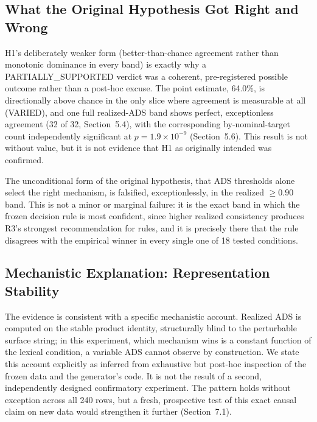 \documentclass[11pt]{article}
\begin{document}
\subsection{What the Original Hypothesis Got Right and Wrong}
\label{sec:hypothesis-verdict}

H1's deliberately weaker form (better-than-chance agreement rather than monotonic
dominance in every band) is exactly why a PARTIALLY\_SUPPORTED verdict was
a coherent, pre-registered possible outcome rather than a post-hoc excuse.
The point estimate, 64.0\%, is directionally above chance in the only slice
where agreement is measurable at all (VARIED), and one full realized-ADS band
shows perfect, exceptionless agreement (32 of 32, Section~5.4), with the
corresponding by-nominal-target count independently significant at
$p=1.9\times10^{-9}$ (Section~5.6). This result is not without value, but it
is not evidence that H1 as originally intended was confirmed.

The unconditional form of the original hypothesis, that ADS thresholds
alone select the right mechanism, is falsified, exceptionlessly, in the
realized $\geq0.90$ band. This is not a minor or marginal failure: it is the
exact band in which the frozen decision rule is most confident, since higher
realized consistency produces R3's strongest recommendation for rules, and it
is precisely there that the rule disagrees with the empirical winner in every
single one of 18 tested conditions.

\subsection{Mechanistic Explanation: Representation Stability}
\label{sec:representation-stability}

The evidence is consistent with a specific mechanistic account. Realized ADS
is computed on the stable product identity, structurally blind to the
perturbable surface string; in this experiment, which mechanism wins is a
constant function of the lexical condition, a variable ADS cannot observe by
construction. We state this account explicitly as inferred from exhaustive
but post-hoc inspection of the frozen data and the generator's code. It is
not the result of a second, independently designed confirmatory experiment.
The pattern holds without exception across all 240 rows, but a fresh,
prospective test of this exact causal claim on new data would strengthen it
further
(Section~7.1).
\end{document}
